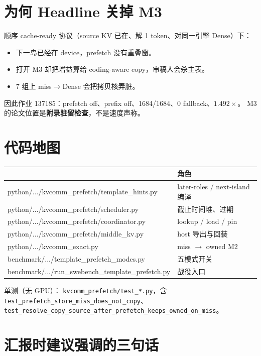 \documentclass[UTF8,a4paper,11pt,fontset=fandol]{ctexart}
\begin{document}
\section{为何 Headline 关掉 M3}

顺序 cache-ready 协议（source KV 已在、解 1 token、对同一引擎 Dense）下：

\begin{itemize}
  \item 下一岛已经在 device，prefetch 没有重叠窗。
  \item 打开 M3 却把增益算给 coding-aware copy，审稿人会杀主表。
  \item 7 组上 miss$\to$Dense 会把拷贝核弄脏。
\end{itemize}

因此作业 137185：prefetch off、prefix off、1684/1684、0 fallback、$1.492\times$。
M3 的论文位置是\textbf{附录驻留检查}，不是速度声称。

\section{代码地图}

\begin{center}
\small
\begin{tabular}{>{\ttfamily}p{}p{}}
\toprule
\multicolumn{1}{l}{\textbf{路径}} & \textbf{角色} \\
\midrule
python/.../kvcomm\_prefetch/template\_hints.py & later-roles / next-island 编译 \\
python/.../kvcomm\_prefetch/scheduler.py & 截止时间堆、过期 \\
python/.../kvcomm\_prefetch/coordinator.py & lookup / load / pin \\
python/.../kvcomm\_prefetch/middle\_kv.py & host 导出与回装 \\
python/.../kvcomm\_exact.py & miss $\to$ owned M2 \\
benchmark/.../template\_prefetch\_modes.py & 五模式开关 \\
benchmark/.../run\_swebench\_template\_prefetch.py & 战役入口 \\
\bottomrule
\end{tabular}
\end{center}

单测（无 GPU）：
\texttt{kvcomm\_prefetch/test\_*.py}，含
\texttt{test\_prefetch\_store\_miss\_does\_not\_copy}、
\texttt{test\_resolve\_copy\_source\_after\_prefetch\_keeps\_owned\_on\_miss}。

\section{汇报时建议强调的三句话}
\end{document}
